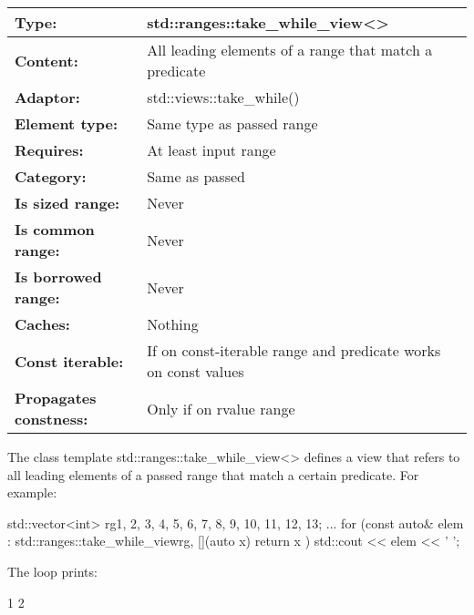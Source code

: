\begin{longtable}[c]{|l|l|}
\hline
\textbf{Type:}                 & std::ranges::take\_while\_view\textless{}\textgreater{}        \\ \hline
\endfirsthead
%
\endhead
%
\textbf{Content:}              & All leading elements of a range that match a predicate         \\ \hline
\textbf{Adaptor:}           & std::views::take\_while() \\ \hline
\textbf{Element type:}      & Same type as passed range \\ \hline
\textbf{Requires:}          & At least input range      \\ \hline
\textbf{Category:}          & Same as passed            \\ \hline
\textbf{Is sized range:}    & Never                     \\ \hline
\textbf{Is common range:}   & Never                     \\ \hline
\textbf{Is borrowed range:} & Never                     \\ \hline
\textbf{Caches:}            & Nothing                   \\ \hline
\textbf{Const iterable:}       & If on const-iterable range and predicate works on const values \\ \hline
\textbf{Propagates constness:} & Only if on rvalue range                                        \\ \hline
\end{longtable}

The class template std::ranges::take\_while\_view<> defines a view that refers to all leading elements of a passed range that match a certain predicate. For example:

\begin{cpp}
std::vector<int> rg{1, 2, 3, 4, 5, 6, 7, 8, 9, 10, 11, 12, 13};
...
for (const auto& elem : std::ranges::take_while_view{rg, [](auto x) {
									return x %
							}}) {
	std::cout << elem << ' ';
}
\end{cpp}

The loop prints:

\begin{shell}
1 2
\end{shell}

